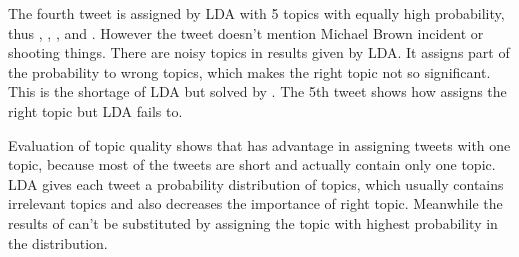 The fourth tweet is assigned by LDA with 5 topics with equally high probability, thus \protest, \michaelbrown, \shootincident, \emotion and \raceandcommunity. However the tweet doesn't mention Michael Brown incident or shooting things. There are noisy topics in results given by LDA. It assigns part of the probability to wrong topics, which makes the right topic not so significant. This is the shortage of LDA but solved by \stlda. The 5th tweet shows how \stlda assigns the right topic but LDA fails to.

Evaluation of topic quality shows that \stlda has advantage in assigning tweets with one topic, because most of the tweets are short and actually contain only one topic. LDA gives each tweet a probability distribution of topics, which usually contains irrelevant topics and also decreases the importance of right topic. Meanwhile the results of \stlda can't be substituted by assigning the topic with highest probability in the distribution.




